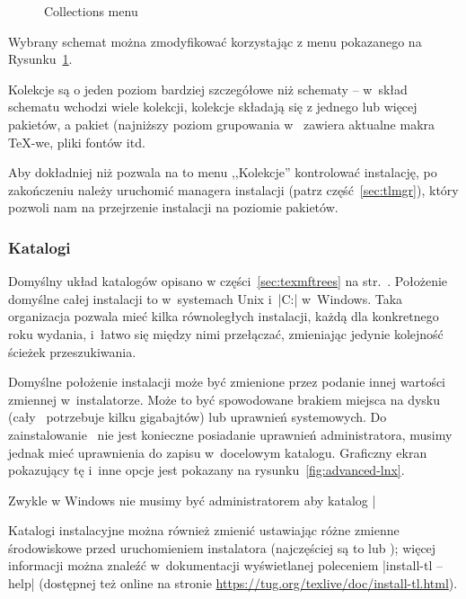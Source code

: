 \documentclass{article}
\begin{document}
\begin{figure}[tb]
\def\figdesc{Collections menu}
\centering \tlpng{stdcoll}{.7\linewidth}{\figdesc}
\caption{\figdesc}\label{fig:collections-gui}
\end{figure}

Wybrany schemat można zmodyfikować korzystając z menu  pokazanego na 
Rysunku~\ref{fig:collections-gui}.

Kolekcje są o jeden poziom bardziej szczegółowe niż schematy -- w~skład schematu wchodzi
wiele kolekcji, kolekcje składają się z jednego lub więcej  pakietów, a pakiet
(najniższy poziom grupowania w~\TL{} zawiera aktualne makra \TeX-we, pliki fontów itd.

Aby  dokładniej niż pozwala na to menu ,,Kolekcje'' kontrolować  instalację,
po zakończeniu należy uruchomić managera instalacji 
(patrz część~\ref{sec:tlmgr}), który pozwoli nam na przejrzenie instalacji
na poziomie pakietów.

\subsubsection{Katalogi}
\label{sec:directories}

Domyślny układ katalogów opisano w części~\ref{sec:texmftrees} na
str.~\pageref{sec:texmftrees}. Położenie domyślne całej instalacji to
 w~systemach Unix i~|C:\texlive{}| w~Windows.
Taka organizacja pozwala mieć  kilka równoległych instalacji, każdą dla konkretnego
roku wydania, i~łatwo się  między nimi przełączać, zmieniając jedynie
kolejność ścieżek przeszukiwania.


Domyślne położenie instalacji  może być zmienione przez podanie innej wartości
zmiennej   w~instalatorze. Może to być spowodowane  brakiem
miejsca na dysku (cały \TL\ potrzebuje kilku gigabajtów) lub uprawnień systemowych.
Do zainstalowanie \TL\ nie jest konieczne posiadanie uprawnień administratora,
musimy jednak mieć uprawnienia do zapisu w~docelowym katalogu.
Graficzny ekran pokazujący tę i~inne opcje jest pokazany na rysunku~\ref{fig:advanced-lnx}.

Zwykle w   Windows  nie musimy być administratorem aby katalog |%

Katalogi instalacyjne można również zmienić ustawiając różne
zmienne środowiskowe przed uruchomieniem instalatora (najczęściej są to
 lub
); więcej informacji można znaleźć w~dokumentacji
wyświetlanej poleceniem |install-tl --help| (dostępnej też online na stronie
\url{https://tug.org/texlive/doc/install-tl.html}).
\end{document}
